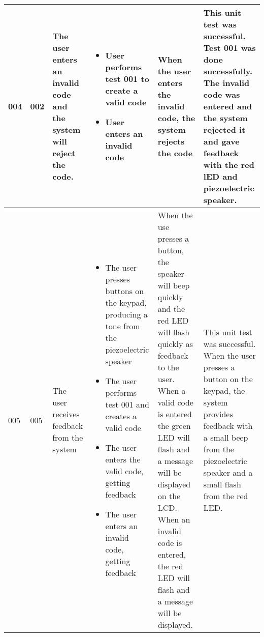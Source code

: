 \begin{center}
\begin{tabular}{|p{1cm}|p{1cm}|p{3cm}|p{3cm}|p{3cm}|p{4cm}|}
      004 & 
      002 &
      The user enters an invalid code and the system will reject the code. & 
      \begin{itemize}
        \item User performs test 001 to create a valid code
        \item User enters an invalid code
      \end{itemize} &
      When the user enters the invalid code, the system rejects the code &
      This unit test was successful. Test 001 was done successfully. The invalid code was entered and the system rejected it and gave feedback with the red lED and piezoelectric speaker.\\ \hline

      005 &
      005 &
      The user receives feedback from the system &
      \begin{itemize}
        \item The user presses buttons on the keypad, producing a tone from the piezoelectric speaker
        \item The user performs test 001 and creates a valid code
        \item The user enters the valid code, getting feedback
        \item The user enters an invalid code, getting feedback
      \end{itemize} &
      When the use presses a button, the speaker will beep quickly and the red LED will flash quickly as feedback to the user. When a valid code is entered the green LED will flash and a message will be displayed on the LCD.
      When an invalid code is entered, the red LED will flash and a message will be displayed. & 
      This unit test was successful. When the user presses a button on the keypad, the system provides feedback with a small beep from the piezoelectric speaker and a small flash from the red LED.\\ \hline


    \end{tabular} \\
  \end{center}

